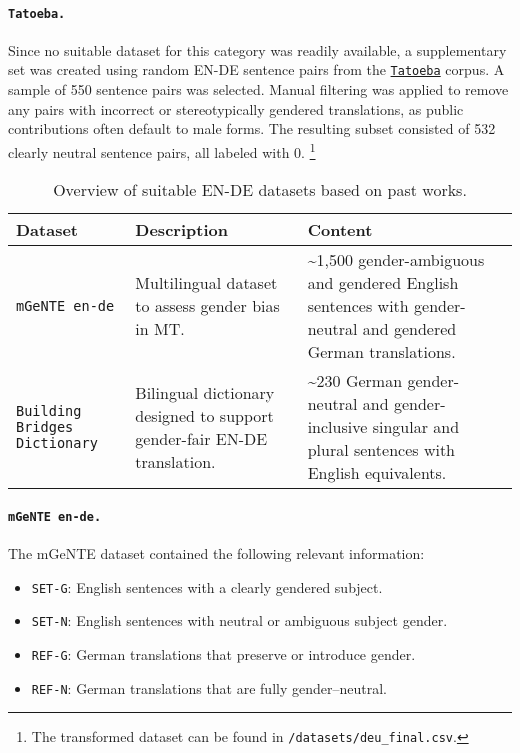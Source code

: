 \paragraph{\texttt{Tatoeba.}} Since no suitable dataset for this category was readily available, a supplementary set was created using random EN-DE sentence pairs from the \href{https://tatoeba.org/en/}{\texttt{Tatoeba}} corpus. A sample of 550 sentence pairs was selected. Manual filtering was applied to remove any pairs with incorrect or stereotypically gendered translations, as public contributions often default to male forms. The resulting subset consisted of 532 clearly neutral sentence pairs, all labeled with 0. \footnote{The transformed dataset can be found in \texttt{/datasets/deu\_final.csv}.} 

\begin{table}[ht!]
    \centering
    \renewcommand{\arraystretch}{1.3}
    \begin{tabularx}{\textwidth}{|>{\raggedright\arraybackslash}X|>{\raggedright\arraybackslash}X|>{\raggedright\arraybackslash}X|}
    \hline
    \textbf{Dataset} & \textbf{Description} & \textbf{Content} \\ \hline
    \texttt{mGeNTE en-de} \parencite{savoldiMGeNTEMultilingualResource2025} & Multilingual dataset to assess gender bias in MT. & \textasciitilde1,500 gender-ambiguous and gendered English sentences with gender-neutral and gendered German translations. \\ \hline
    \texttt{Building Bridges Dictionary} \parencite{lardelliBuildingBridgesDataset2024} & Bilingual dictionary designed to support gender-fair EN-DE translation. & \textasciitilde230 German gender-neutral and gender-inclusive singular and plural sentences with English equivalents. \\ \hline
    \end{tabularx}
    \caption{Overview of suitable EN-DE datasets based on past works.}
    \label{tab:available_datasets}
\end{table}

\paragraph {\texttt{mGeNTE en-de.}} The mGeNTE dataset contained the following relevant information:  

\begin{itemize}  
  \item \texttt{SET-G}: English sentences with a clearly gendered subject.  
  \item \texttt{SET-N}: English sentences with neutral or ambiguous subject gender.  
  \item \texttt{REF-G}: German translations that preserve or introduce gender.  
  \item \texttt{REF-N}: German translations that are fully gender–neutral.  
\end{itemize}  

